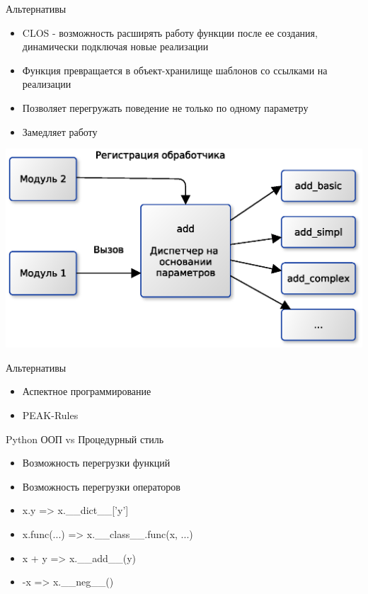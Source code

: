 \documentclass{article}
\begin{document}
\begin{center} Альтернативы \end{center}
\begin{itemize}
    \item CLOS - возможность расширять работу функции после ее создания,
          динамически подключая новые реализации
    \item Функция превращается в объект-хранилище шаблонов со ссылками на реализации
    \item Позволяет перегружать поведение не только по одному параметру
    \item Замедляет работу
\end{itemize}
\begin{center} \includegraphics[scale=0.8]{images/CLOS.eps} \end{center} 
\newpage

\begin{center} Альтернативы \end{center}
\begin{itemize}
    \item Аспектное программирование
    \item PEAK-Rules
\end{itemize}
\newpage

\begin{center} Python ООП vs Процедурный стиль \end{center}
\begin{itemize}
    \item Возможность перегрузки функций
    \item Возможность перегрузки операторов
    \item x.y => x.\_\_dict\_\_['y']
    \item x.func(...) => x.\_\_class\_\_.func(x, ...)
    \item x + y => x.\_\_add\_\_(y)
    \item -x => x.\_\_neg\_\_()
\end{itemize}
\newpage
\end{document}
